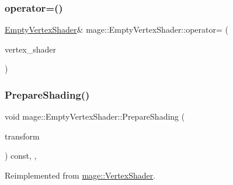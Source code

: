 \hypertarget{classmage_1_1_empty_vertex_shader_a449401b726fc5cd30012a3d8df2e0832}{}\label{classmage_1_1_empty_vertex_shader_a449401b726fc5cd30012a3d8df2e0832} 
\subsubsection{\texorpdfstring{operator=()}{operator=()}\hspace{0.1cm}{\footnotesize\ttfamily [2/2]}}
{\footnotesize\ttfamily \hyperlink{classmage_1_1_empty_vertex_shader}{Empty\+Vertex\+Shader}\& mage\+::\+Empty\+Vertex\+Shader\+::operator= (\begin{DoxyParamCaption}\item[{\hyperlink{classmage_1_1_empty_vertex_shader}{Empty\+Vertex\+Shader} \&\&}]{vertex\+\_\+shader }\end{DoxyParamCaption})\hspace{0.3cm}{\ttfamily [delete]}}

\hypertarget{classmage_1_1_empty_vertex_shader_a6b3619814f0d59bcf4b4edf2dab9a10c}{}\label{classmage_1_1_empty_vertex_shader_a6b3619814f0d59bcf4b4edf2dab9a10c} 
\subsubsection{\texorpdfstring{Prepare\+Shading()}{PrepareShading()}}
{\footnotesize\ttfamily void mage\+::\+Empty\+Vertex\+Shader\+::\+Prepare\+Shading (\begin{DoxyParamCaption}\item[{I\+D3\+D11\+Buffer $\ast$}]{transform }\end{DoxyParamCaption}) const\hspace{0.3cm}{\ttfamily [final]}, {\ttfamily [override]}, {\ttfamily [virtual]}}



Reimplemented from \hyperlink{classmage_1_1_vertex_shader_a53f4b25241f6c5739724d421c9f29a36}{mage\+::\+Vertex\+Shader}.

